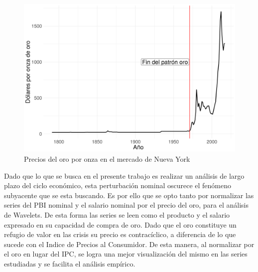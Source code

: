 \documentclass[a4paper]{article}
\begin{document}
\begin{figure}[H]
	\centering
	\includegraphics[width=0.8\linewidth]{oro.png}
	\caption{Precios del oro por onza en el mercado de Nueva York} \label{fig:oro}
\end{figure}

Dado que lo que se busca en el presente trabajo es realizar un análisis de largo plazo del ciclo económico, esta perturbación nominal oscurece el fenómeno subyacente que se esta buscando. Es por ello que se opto tanto por normalizar las series del PBI nominal y el salario nominal por el precio del oro, para el análisis de Wavelets. De esta forma las series se leen como el producto y el salario expresado en su capacidad de compra de oro.
Dado que el oro constituye un refugio de valor en las crisis su precio es contracíclico, a diferencia de lo que sucede con el Indice de Precios al Consumidor. De esta manera, al normalizar por el oro en lugar del IPC, se logra una mejor visualización del mismo en las series estudiadas y se facilita el análisis empírico.

%
\end{document}
